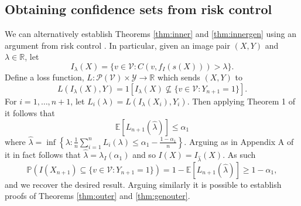 \subsection{Obtaining confidence sets from risk control}\label{risk2con}
We can alternatively establish Theorems \ref{thm:inner} and \ref{thm:innergen} using an argument from risk control \citep{Angelopoulos2022}. In particular, given an image pair $(X,Y)$ and $\lambda \in \mathbb{R}$, let $$I_\lambda(X) =  \lbrace v \in \mathcal{V}: C(v, f_I(s(X))) > \lambda \rbrace.$$ Define a loss function, $L:\mathcal{P}(\mathcal{V}) \times \mathcal{Y} \rightarrow \mathbb{R}$ which sends $(X,Y)$ to 
\begin{equation*}
	L(I_\lambda(X), Y) = 1\left[ I_\lambda(X) \not \subseteq\lbrace v\in \mathcal{V}: Y_{n+1} = 1 \rbrace \right].
\end{equation*}
For $i = 1, \dots, n + 1$, let 	$L_i(\lambda) = 	L(I_\lambda(X_i), Y_i)$. Then applying Theorem 1 of \cite{Angelopoulos2022} it follows that 
\begin{equation*}
	\mathbb{E}\left[ L_{n+1}(\hat{\lambda})\right] \leq \alpha_1
\end{equation*}
where $\hat{\lambda} = \inf\left\lbrace \lambda: \frac{1}{n}\sum_{i = 1}^n L_i(\lambda) \leq \alpha_1 - \frac{1-\alpha_1}{n}\right\rbrace$. Arguing as in Appendix A of \citep{Angelopoulos2022} it in fact follows that $\hat{\lambda}  = \lambda_I(\alpha_1)$ and so $I(X) = I_{\hat{\lambda}}(X)$. As such 	
\begin{equation}\label{eq:probstat2}
	\mathbb{P}\left( I(X_{n+1}) \subseteq\lbrace v\in \mathcal{V}: Y_{n+1} = 1 \rbrace \right) = 1 - \mathbb{E}\left[ L_{n+1}(\hat{\lambda})\right]  \geq 1 - \alpha_1, 
\end{equation}
and we recover the desired result. Arguing similarly it is possible to establish proofs of Theorems \ref{thm:outer} and \ref{thm:genouter}.

